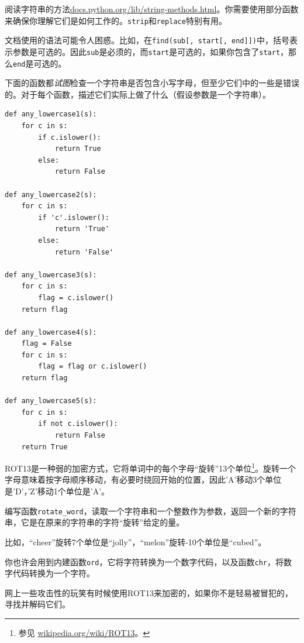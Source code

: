 \begin{ex}

阅读字符串的方法\url{docs.python.org/lib/string-methods.html}。你需要使用部分函数来确保你理解它们是如何工作的。{\tt strip}和{\tt replace}特别有用。

文档使用的语法可能令人困惑。比如，在\verb"find(sub[, start[, end]])"中，括号表示参数是可选的。因此{\tt sub}是必须的，而{\tt start}是可选的，如果你包含了{\tt start}，那么{\tt end}是可选的。
\end{ex}

\begin{ex}
下面的函数都{\em 试图}检查一个字符串是否包含小写字母，但至少它们中的一些是错误的。对于每个函数，描述它们实际上做了什么（假设参数是一个字符串）。

\beforeverb
\begin{verbatim}
def any_lowercase1(s):
    for c in s:
        if c.islower():
            return True
        else:
            return False

def any_lowercase2(s):
    for c in s:
        if 'c'.islower():
            return 'True'
        else:
            return 'False'

def any_lowercase3(s):
    for c in s:
        flag = c.islower()
    return flag

def any_lowercase4(s):
    flag = False
    for c in s:
        flag = flag or c.islower()
    return flag

def any_lowercase5(s):
    for c in s:
        if not c.islower():
            return False
    return True
\end{verbatim}
\afterverb

\end{ex}


\begin{ex}

\label{exrotate}
ROT13是一种弱的加密方式，它将单词中的每个字母“旋转”13个单位\footnote{参见 \url{wikipedia.org/wiki/ROT13}。}。旋转一个字母意味着按字母顺序移动，有必要时绕回开始的位置，因此'A'移动3个单位是'D'，'Z'移动1个单位是'A'。

编写函数\verb"rotate_word"，读取一个字符串和一个整数作为参数，返回一个新的字符串，它是在原来的字符串的字符“旋转”给定的量。

比如，“cheer”旋转7个单位是“jolly”，“melon”旋转-10个单位是“cubed”。


你也许会用到内建函数{\tt ord}，它将字符转换为一个数字代码，以及函数{\tt chr}，将数字代码转换为一个字符。

网上一些攻击性的玩笑有时候使用ROT13来加密的，如果你不是轻易被冒犯的，寻找并解码它们。
\end{ex}


